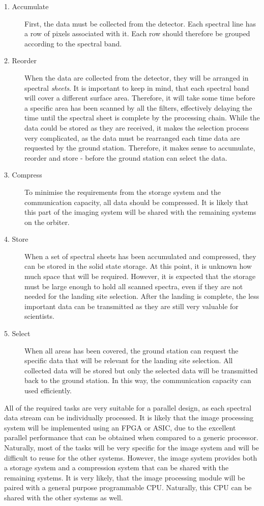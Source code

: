 \begin{description}
\item[1. Accumulate] First, the data must be collected from the detector. Each spectral line has a row of pixels associated with it. Each row should therefore be grouped according to the spectral band.
\item[2. Reorder] When the data are collected from the detector, they will be arranged in spectral \textit{sheets}. It is important to keep in mind, that each spectral band will cover a different surface area. Therefore, it will take some time before a specific area has been scanned by all the filters, effectively delaying the time until the spectral sheet is complete by the processing chain. While the data could be stored as they are received, it makes the selection process very complicated, as the data must be rearranged each time data are requested by the ground station. Therefore, it makes sense to accumulate, reorder and store - before the ground station can select the data.
\item[3. Compress] To minimise the requirements from the storage system and the communication capacity, all data should be compressed. It is likely that this part of the imaging system will be shared with the remaining systems on the orbiter.
\item[4. Store] When a set of spectral sheets has been accumulated and compressed, they can be stored in the solid state storage. At this point, it is unknown how much space that will be required. However, it is expected that the storage must be large enough to hold all scanned spectra, even if they are not needed for the landing site selection. After the landing is complete, the less important data can be transmitted as they are still very valuable for scientists.
\item[5. Select] When all areas has been covered, the ground station can request the specific data that will be relevant for the landing site selection. All collected data will be stored but only the selected data will be transmitted back to the ground station. In this way, the communication capacity can used efficiently. 
\end{description}
All of the required tasks are very suitable for a parallel design, as each spectral data stream can be individually processed. It is likely that the image processing system will be implemented using an FPGA or ASIC, due to the excellent parallel performance that can be obtained when compared to a generic processor. 
Naturally, most of the tasks will be very specific for the image system and will be difficult to reuse for the other systems. However, the image system provides both a storage system and a compression system that can be shared with the remaining systems. It is very likely, that the image processing module will be paired with a general purpose programmable CPU. Naturally, this CPU can be shared with the other systems as well.
